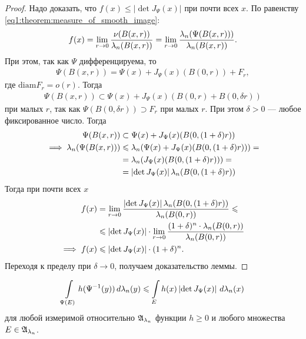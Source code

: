 \begin{proof}
 Надо доказать, что $f(x) \leqslant \left| \det J_{\Psi}(x) \right|$ при почти всех $x$. По равенству \eqref{eq1:theorem:measure_of_smooth_image}: \begin{align*}
  f(x) = \lim_{r \to 0}  \frac{\nu(B(x,r ))}{\lambda_n(B(x,r))} = \lim_{r \to 0} \frac{\lambda_n(\Psi(B(x,r)))}{\lambda_n(B(x,r))}
 .\end{align*} При этом, так как $\Psi$ дифференцируема, то \begin{align*}
  \Psi(B(x,r)) = \Psi(x) + J_{\Psi}(x) (B(0, r)) + F_r 
 ,\end{align*} где $\mathrm{diam} F_r = o(r)$. Тогда \begin{align*}
 \Psi(B(x,r)) \subset \Psi(x) + J_{\Psi}(x) (B(0, r) + B(0, \delta r))
 \end{align*} при малых $r$, так как $\Psi(B(0, \delta r)) \supset F_r$ при малых $r$. При этом $\delta > 0$ --- любое фиксированное число. Тогда
 \begin{align*}
  \Psi(B(x,r)) &\subset \Psi(x) + J_{\Psi}(x)(B(0, (1+\delta)r)) \\
  \implies \lambda_n(\Psi(B(x,r))) &\leqslant \lambda_n(\Psi(x) + J_{\Psi}(x) (B(0, (1+\delta)r))) = \\ &= \lambda_n(J_{\Psi}(x) (B(0, (1 + \delta)r)))  = \\
  &= \left| \det J_{\Psi}(x) \right| \lambda_n(B(0, (1 + \delta)r))
 \end{align*} Тогда при почти всех $x$ \begin{align*}
 f(x) &= \lim_{r \to 0}  \frac{\left| \det J_{\Psi}(x) \right| \lambda_n(B(0, (1 + \delta)r))}{\lambda_n(B(0,r))} \leqslant \\
 &\leqslant \left| \det J_{\Psi}(x) \right| \cdot \lim_{r\to 0} \frac{(1+\delta)^{n} \cdot \lambda_n(B(0,r))}{\lambda_n(B(0,r))} \\
 \implies f(x) &\leqslant \left| \det J_{\Psi}(x) \right| \cdot (1 + \delta)^{n}
 .\end{align*} Переходя к пределу при $\delta \to 0$, получаем доказательство леммы.
\end{proof}
\begin{lm}
 \begin{align}
  \label{eq:lemma:measure_of_smooth_image_weird}
  \int\limits_{\Psi(E)} h (\Psi^{-1}(y)) \, d\lambda_n(y)   \leqslant \int\limits_{E} h(x) \left| \det J_{\Psi}(x) \right| \, d\lambda_n(x)  
 \end{align} для любой измеримой относительно $\mathfrak{A}_{\lambda_n}$ функции  $h \geqslant 0$ и любого множества $E \in \mathfrak{A}_{\lambda_n}$.
\end{lm}
